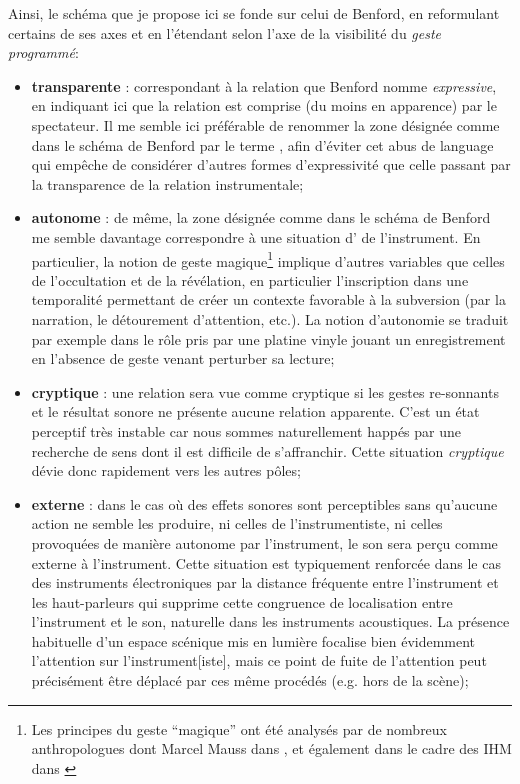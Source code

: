 \noindent Ainsi, le schéma que je propose ici se fonde sur celui de Benford, en reformulant certains de ses axes et en l'étendant selon l'axe de la visibilité du \textit{geste programmé}:
\vspace{-1em}
\begin{itemize}[noitemsep]
	\item \textbf{transparente} : correspondant à la relation que Benford nomme \textit{expressive}, en indiquant ici que la relation est comprise (du moins en apparence) par le spectateur. Il me semble ici préférable de renommer la zone désignée comme  dans le schéma de Benford par le terme , afin d'éviter cet abus de language qui empêche de considérer d'autres formes d'expressivité que celle passant par la transparence de la relation instrumentale;
	\item \textbf{autonome} : de même, la zone désignée comme  dans le schéma de Benford me semble davantage correspondre à une situation d' de l'instrument. En particulier, la notion de geste magique\footnote{Les principes du geste ``magique'' ont été analysés par de nombreux anthropologues dont Marcel Mauss dans \cite{mauss_esquisse_1902}, et également dans le cadre des \gls{IHM} dans \cite{lokuge_dynamic_1995, marshall_deception_2010}} implique d'autres variables que celles de l'occultation et de la révélation, en particulier l'inscription dans une temporalité permettant de créer un contexte favorable à la subversion (par la narration, le détourement d'attention, etc.). La notion d'autonomie se traduit par exemple dans le rôle pris par une platine vinyle jouant un enregistrement en l'absence de geste venant perturber sa lecture;
	\item \textbf{cryptique} : une relation sera vue comme cryptique si les gestes re-sonnants et le résultat sonore ne présente aucune relation apparente. C'est un état perceptif très instable car nous sommes naturellement happés par une recherche de sens dont il est difficile de s'affranchir. Cette situation \textit{cryptique} dévie donc rapidement vers les autres pôles;
	\item \textbf{externe} : dans le cas où des effets sonores sont perceptibles sans qu'aucune action ne semble les produire, ni celles de l'instrumentiste, ni celles provoquées de manière autonome par l'instrument, le son sera perçu comme externe à l'instrument. Cette situation est typiquement renforcée dans le cas des instruments électroniques par la distance fréquente entre l'instrument et les haut-parleurs qui supprime cette congruence de localisation entre l'instrument et le son, naturelle dans les instruments acoustiques. La présence habituelle d'un espace scénique mis en lumière focalise bien évidemment l'attention sur l'instrument[iste], mais ce point de fuite de l'attention peut précisément être déplacé par ces même procédés (e.g. hors de la scène);

\end{itemize}
